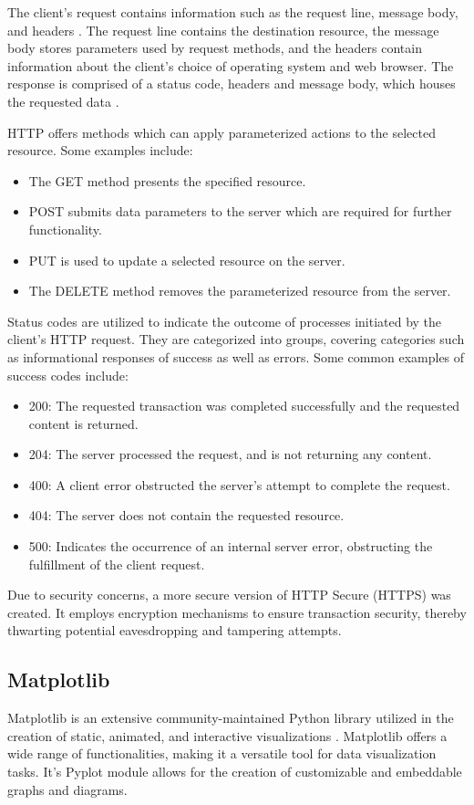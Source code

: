 \documentclass{thesis-ekf}
\theoremstyle{definition}
\theoremstyle{remark}
\begin{document}
{The client's request contains information such as the request line, message body, and headers \cite{req-head}. The request line contains the destination resource, the message body stores parameters used by request methods, and the headers contain information about the client's choice of operating system and web browser. The response is comprised of a status code, headers and message body, which houses the requested data \cite{wiki-http}.

HTTP offers methods which can apply parameterized actions to the selected resource. Some examples include:
\begin{itemize}
	\item The GET method presents the specified resource. 
	\item POST submits data parameters to the server which are required for further functionality.
	\item PUT is used to update a selected resource on the server.
	\item The DELETE method removes the parameterized resource from the server.
\end{itemize}

Status codes are utilized to indicate the outcome of processes initiated by the client's HTTP request. They are categorized into groups, covering categories such as informational responses of success as well as errors. Some common examples of success codes include:
\begin{itemize}
	\item 200: The requested transaction was completed successfully and the requested content is returned.
	\item 204: The server processed the request, and is not returning any content.
	\item 400: A client error obstructed the server's attempt to complete the request.
	\item 404: The server does not contain the requested resource.
	\item 500: Indicates the occurrence of an internal server error, obstructing the fulfillment of the client request.
\end{itemize}

Due to security concerns, a more secure version of HTTP Secure (HTTPS) \cite{wiki-https} was created. It employs encryption mechanisms to ensure transaction security, thereby thwarting potential eavesdropping and tampering attempts. 

\subsection{Matplotlib}
Matplotlib is an extensive community-maintained Python library utilized in the creation of static, animated, and interactive visualizations \cite{matplotlib}. Matplotlib offers a wide range of functionalities, making it a versatile tool for data visualization tasks. It's Pyplot module allows for the creation of customizable and embeddable graphs and diagrams.

}
\end{document}
